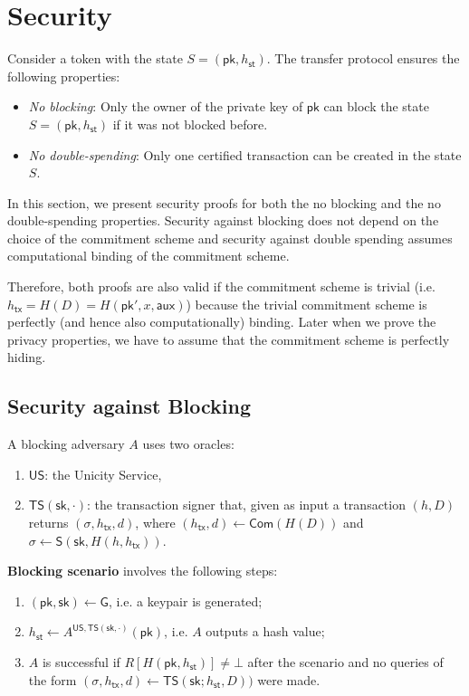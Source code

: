 \documentclass{article}
\newcommand{\pubkey}[0]{\mathsf{pk}}
\newcommand{\prikey}[0]{\mathsf{sk}}
\newcommand{\commit}[0]{\mathsf{Com}}
\newcommand{\sthash}[0]{h_\mathsf{st}}
\newcommand{\txhash}[0]{h_\mathsf{tx}}
\newcommand{\auxd}[0]{\mathsf{aux}}
\begin{document}
\section{Security}
Consider a token with the state $S = (\pubkey, \sthash)$. The transfer protocol ensures the following properties:
\begin{itemize}
\item \emph{No blocking}:
Only the owner of the private key of $\pubkey$ can block the state $S = (\pubkey, \sthash)$ if it was not blocked before.
\item \emph{No double-spending}:
Only one certified transaction can be created in the state $S$.
\end{itemize}

\noindent In this section, we present security proofs for both the no blocking and the no double-spending properties. Security against blocking does not depend on the choice of the commitment scheme and security against double spending assumes computational binding of the commitment scheme.

Therefore, both proofs are also valid if the commitment scheme is trivial (i.e. $\txhash = H(D)=H(\pubkey',x,\auxd)$) because the trivial commitment scheme is perfectly (and hence also computationally) binding. Later when we prove the privacy properties, we have to assume that the commitment scheme is perfectly hiding.



\subsection{Security against Blocking}

A blocking adversary $A$ uses two oracles:
\begin{enumerate}
\item $\mathsf{US}$: the Unicity Service,
\item $\mathsf{TS}(\prikey,\cdot)$: the transaction signer that, given as input a transaction $(h,D)$ returns $(\sigma, \txhash, d)$, where
$(\txhash, d)\gets \commit(H(D))$ and
$\sigma \gets \mathsf{S}(\prikey,H(h,\txhash))$.
\end{enumerate}

\noindent\textbf{Blocking scenario} involves the following steps:
\begin{enumerate}
\item $(\pubkey,\prikey)\gets \mathsf{G}$, i.e. a keypair is generated;
\item $h_\mathsf{st}\gets A^{\mathsf{US},\mathsf{TS}(\prikey,\cdot)}(\pubkey)$, i.e. $A$ outputs a hash value;
\item $A$ is successful if
$R[H(\pubkey,h_\mathsf{st})]\neq\bot$ after the scenario
and no queries of the form $(\sigma,\txhash,d)\gets\mathsf{TS}(\prikey;h_\mathsf{st},D))$ were made.
\end{enumerate}
\end{document}
